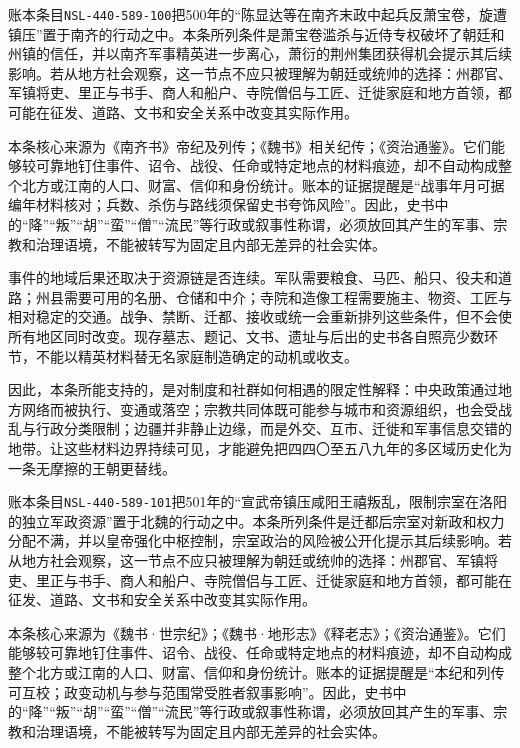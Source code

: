 账本条目\texttt{NSL-440-589-100}把500年的“陈显达等在南齐末政中起兵反萧宝卷，旋遭镇压”置于南齐的行动之中。本条所列条件是萧宝卷滥杀与近侍专权破坏了朝廷和州镇的信任，并以南齐军事精英进一步离心，萧衍的荆州集团获得机会提示其后续影响。若从地方社会观察，这一节点不应只被理解为朝廷或统帅的选择：州郡官、军镇将吏、里正与书手、商人和船户、寺院僧侣与工匠、迁徙家庭和地方首领，都可能在征发、道路、文书和安全关系中改变其实际作用。

本条核心来源为《南齐书》帝纪及列传；《魏书》相关纪传；《资治通鉴》。它们能够较可靠地钉住事件、诏令、战役、任命或特定地点的材料痕迹，却不自动构成整个北方或江南的人口、财富、信仰和身份统计。账本的证据提醒是“战事年月可据编年材料核对；兵数、杀伤与路线须保留史书夸饰风险”。因此，史书中的“降”“叛”“胡”“蛮”“僧”“流民”等行政或叙事性称谓，必须放回其产生的军事、宗教和治理语境，不能被转写为固定且内部无差异的社会实体。

事件的地域后果还取决于资源链是否连续。军队需要粮食、马匹、船只、役夫和道路；州县需要可用的名册、仓储和中介；寺院和造像工程需要施主、物资、工匠与相对稳定的交通。战争、禁断、迁都、接收或统一会重新排列这些条件，但不会使所有地区同时改变。现存墓志、题记、文书、遗址与后出的史书各自照亮少数环节，不能以精英材料替无名家庭制造确定的动机或收支。

因此，本条所能支持的，是对制度和社群如何相遇的限定性解释：中央政策通过地方网络而被执行、变通或落空；宗教共同体既可能参与城市和资源组织，也会受战乱与行政分类限制；边疆并非静止边缘，而是外交、互市、迁徙和军事信息交错的地带。让这些材料边界持续可见，才能避免把四四〇至五八九年的多区域历史化为一条无摩擦的王朝更替线。

账本条目\texttt{NSL-440-589-101}把501年的“宣武帝镇压咸阳王禧叛乱，限制宗室在洛阳的独立军政资源”置于北魏的行动之中。本条所列条件是迁都后宗室对新政和权力分配不满，并以皇帝强化中枢控制，宗室政治的风险被公开化提示其后续影响。若从地方社会观察，这一节点不应只被理解为朝廷或统帅的选择：州郡官、军镇将吏、里正与书手、商人和船户、寺院僧侣与工匠、迁徙家庭和地方首领，都可能在征发、道路、文书和安全关系中改变其实际作用。

本条核心来源为《魏书·世宗纪》；《魏书·地形志》《释老志》；《资治通鉴》。它们能够较可靠地钉住事件、诏令、战役、任命或特定地点的材料痕迹，却不自动构成整个北方或江南的人口、财富、信仰和身份统计。账本的证据提醒是“本纪和列传可互校；政变动机与参与范围常受胜者叙事影响”。因此，史书中的“降”“叛”“胡”“蛮”“僧”“流民”等行政或叙事性称谓，必须放回其产生的军事、宗教和治理语境，不能被转写为固定且内部无差异的社会实体。

